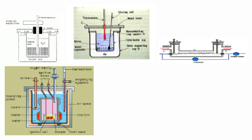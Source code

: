 \documentclass[twocolumn, 11pt]{article}%
\begin{document}
        \begin{center}
            \includegraphics[width=100px]{11.png}
            \includegraphics[width=150px]{12.png}
            \includegraphics[width=150px]{14.png}
            \includegraphics[width=150px]{13.png}
        \end{center}
\end{document}
